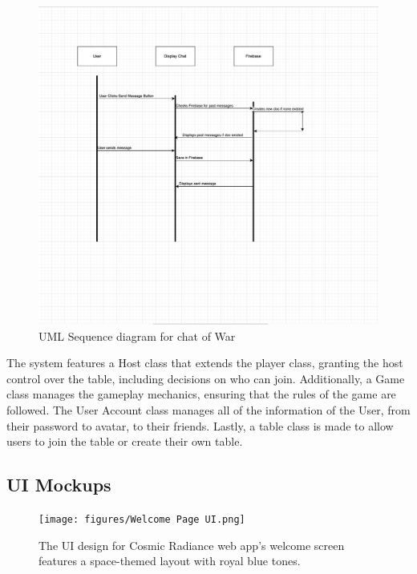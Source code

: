 \begin{figure}
    \centering
    \includegraphics[width=1\linewidth]{figures/Sequence UML .png}
    \caption{UML Sequence diagram for chat of War}
    \label{fig:enter-label}
\end{figure}

The system features a Host class that extends the player class, granting the host control over the table, including decisions on who can join. Additionally, a Game class manages the gameplay mechanics, ensuring that the rules of the game are followed. The User Account class manages all of the information of the User, from their password to avatar, to their friends. Lastly, a table class is made to allow users to join the table or create their own table.

\subsection {UI Mockups}
\begin{figure}
    \centering
    \texttt{[image: figures/Welcome Page UI.png]}
    \caption{The UI design for Cosmic Radiance web app's welcome screen features a space-themed layout with royal blue tones.}
    \label{fig:enter-label}
\end{figure}

